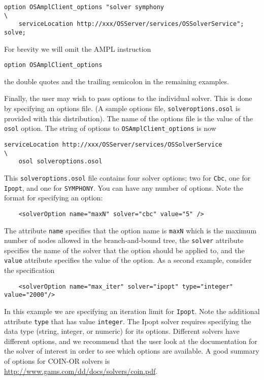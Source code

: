 \begin{verbatim}
option OSAmplClient_options "solver symphony                             \
    serviceLocation http://xxx/OSServer/services/OSSolverService";
solve;
\end{verbatim}


For brevity we will omit the AMPL instruction
\begin{verbatim}
option OSAmplClient_options
\end{verbatim}
the double quotes and the trailing semicolon in the remaining examples.  

\medskip

Finally, the user may wish to pass options to the individual solver. This is done by specifying an options file.
(A sample options file, {\tt solveroptions.osol}\index{solveroptions.osol@{\tt solveroptions.osol}} is 
provided with this distribution).  The name of the options file is the value of the {\tt osol} option.
The string of options to {\tt OSAmplClient\_options} is now
\begin{verbatim}
serviceLocation http://xxx/OSServer/services/OSSolverService              \
    osol solveroptions.osol
\end{verbatim}
This   {\tt solveroptions.osol}  file contains four solver options; two for {\tt Cbc}, one for {\tt Ipopt}, 
and one for {\tt SYMPHONY}.
You can have any number of options. Note the format for specifying an option:
\begin{verbatim}
    <solverOption name="maxN" solver="cbc" value="5" />
\end{verbatim}
The attribute {\tt name} specifies that the option name is {\tt maxN} which is the maximum number of nodes 
allowed in the branch-and-bound tree, the {\tt solver} attribute specifies the name of the solver that the 
option should be applied to, and the {\tt value} attribute specifies the value of the option. 
As a second example, consider the specification
\begin{verbatim}
    <solverOption name="max_iter" solver="ipopt" type="integer" value="2000"/> 
\end{verbatim}
In this example we are specifying an iteration limit for {\tt Ipopt}.  Note the additional attribute 
{\tt type} that has value  {\tt integer}. The Ipopt solver requires specifying the data type 
(string, integer, or numeric) for its options.   Different solvers have different options, 
and we recommend that the user look at the documentation for the solver of interest in order to see 
which options are available.  
A good summary of options for COIN-OR solvers is 
\url{http://www.gams.com/dd/docs/solvers/coin.pdf}.

